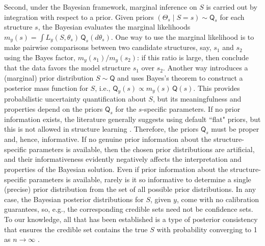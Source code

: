 \documentclass[12pt]{article}
\def\prior{\mathsf{Q}}
\begin{document}
Second, under the Bayesian framework, marginal inference on $S$ is carried out by integration with respect to a prior. Given priors $(\Theta_s \mid S=s) \sim \prior_s$ for each structure $s$, the Bayesian evaluates the marginal likelihoods $m_y(s) = \int L_y(S, \theta_s) \, \prior_s(d\theta_s)$.  One way to use the marginal likelihood is to make pairwise comparisons between two candidate structures, say, $s_1$ and $s_2$ using the Bayes factor, $m_y(s_1)/m_y(s_2)$: if this ratio is large, then conclude that the data favors the model structure $s_1$ over $s_2$. Another way introduces a (marginal) prior distribution $S \sim \prior$ and uses Bayes's theorem to construct a posterior mass function for $S$, i.e., $\prior_y(s) \propto m_y(s) \, \prior(s)$.
This provides probabilistic uncertainty quantification about $S$, but its meaningfulness and properties depend on the priors $\prior_s$ for the $s$-specific parameters. If no prior information exists, the literature generally suggests using default ``flat" priors, but this is not allowed in structure learning \citep[e.g.,][]{berger2001, llorente2022}.  Therefore, the priors $\prior_s$ must be proper and, hence, informative. If no genuine prior information about the structure-specific parameters is available, then the chosen prior distributions are artificial, and their informativeness evidently negatively affects the interpretation and properties of the Bayesian solution. Even if prior information about the structure-specific parameters is available, rarely is it so informative to determine a single (precise) prior distribution from the set of all possible prior distributions. In any case, the Bayesian posterior distributions for $S$, given $y$, come with no calibration guarantees, so, e.g., the corresponding credible sets need not be confidence sets.  To our knowledge, all that has been established is a type of posterior consistency that ensures the credible set contains the true $S$ with probability converging to 1 as $n \to \infty$ \citep[e.g.,][]{casella2009consistency, chae.etal.glm, castillo2015bayesian}. 
\end{document}
